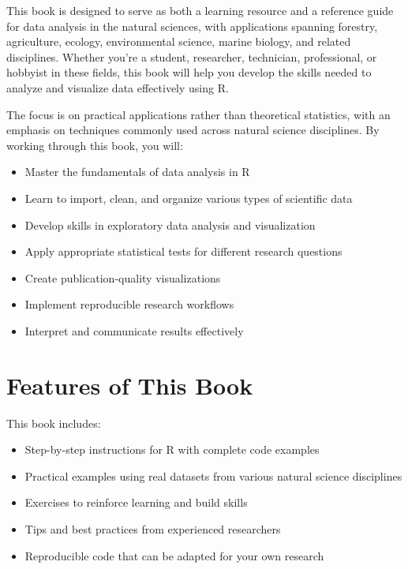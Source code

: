 \documentclass[
  letterpaper,
]{book}
\providecommand{\tightlist}{%
  \setlength{\itemsep}{0pt}\setlength{\parskip}{0pt}}
\begin{document}

This book is designed to serve as both a learning resource and a
reference guide for data analysis in the natural sciences, with
applications spanning forestry, agriculture, ecology, environmental
science, marine biology, and related disciplines. Whether you're a
student, researcher, technician, professional, or hobbyist in these
fields, this book will help you develop the skills needed to analyze and
visualize data effectively using R.

The focus is on practical applications rather than theoretical
statistics, with an emphasis on techniques commonly used across natural
science disciplines. By working through this book, you will:

\begin{itemize}
\tightlist
\item
  Master the fundamentals of data analysis in R
\item
  Learn to import, clean, and organize various types of scientific data
\item
  Develop skills in exploratory data analysis and visualization
\item
  Apply appropriate statistical tests for different research questions
\item
  Create publication-quality visualizations
\item
  Implement reproducible research workflows
\item
  Interpret and communicate results effectively
\end{itemize}

\section*{Features of This Book}\label{features-of-this-book}


This book includes:

\begin{itemize}
\tightlist
\item
  Step-by-step instructions for R with complete code examples
\item
  Practical examples using real datasets from various natural science
  disciplines
\item
  Exercises to reinforce learning and build skills
\item
  Tips and best practices from experienced researchers
\item
  Reproducible code that can be adapted for your own research
\end{itemize}
\end{document}
